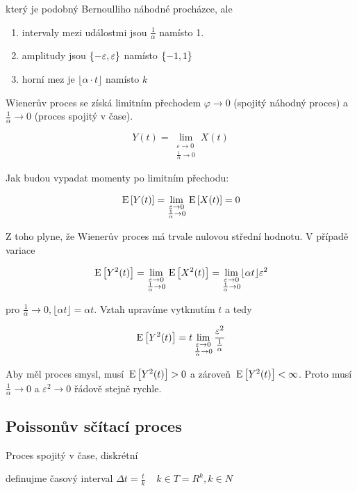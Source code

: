 který je podobný Bernoulliho náhodné procházce, ale

\begin{enumerate}[label=\roman*)]
\item intervaly mezi událostmi jsou $\frac{1}{\alpha}$ namísto 1.
\item amplitudy jsou $\left\{-\varepsilon,\varepsilon\right\}$ namísto $\left\{-1,1\right\}$
\item horní mez je $\lfloor\alpha\cdot t\rfloor$ namísto $k$
\end{enumerate}

Wienerův proces se získá limitním přechodem $\varphi\to 0$ (spojitý náhodný proces) a $\frac{1}{\alpha}\to 0$ (proces spojitý v čase).

\[ Y(t) = \lim_{\substack{\varepsilon\to 0\\ \frac{1}{\alpha}\to 0}} X(t) \]

Jak budou vypadat momenty po limitním přechodu:

\[ \,\mathrm{E}\left[Y(t)\right] = \lim_{\substack{\varepsilon\to 0\\ \frac{1}{\alpha}\to 0}} \,\mathrm{E}\left[X(t)\right]=0 \]

Z toho plyne, že Wienerův proces má trvale nulovou střední hodnotu. V případě variace

\[ \,\mathrm{E}\left[Y^2(t)\right] = \lim_{\substack{\varepsilon\to 0\\ \frac{1}{\alpha}\to 0}} \,\mathrm{E}\left[X^2(t)\right]=\lim_{\substack{\varepsilon\to 0\\ \frac{1}{\alpha}\to 0}} \lfloor\alpha t\rfloor \varepsilon^2 \]

pro $\frac{1}{\alpha}\to 0, \lfloor\alpha t\rfloor=\alpha t$. Vztah upravíme vytknutím $t$ a tedy

\[ \,\mathrm{E}\left[Y^2(t)\right] = t \lim_{\substack{\varepsilon\to 0\\ \frac{1}{\alpha}\to 0}} \frac{\varepsilon^2}{\frac{1}{\alpha}} \]

Aby měl proces smysl, musí $\,\mathrm{E}\left[Y^2(t)\right]>0$ a zároveň $\,\mathrm{E}\left[Y^2(t)\right]<\infty$. Proto musí $\frac{1}{\alpha}\to 0$ a $\varepsilon^2\to 0$ řádově stejně rychle.

\subsection{Poissonův sčítací proces}

Proces spojitý v čase, diskrétní

definujme časový interval $ \Delta t = \frac{t}{k} \;\;\;\; k \in T = R^k, k \in N$

